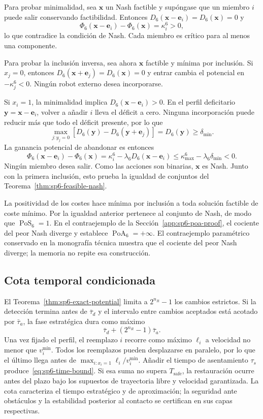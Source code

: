 Para probar minimalidad, sea $\boldsymbol x$ un Nash factible y supóngase que un miembro $i$ puede salir conservando factibilidad. Entonces
$D_6(\boldsymbol x-\boldsymbol e_i)=D_6(\boldsymbol x)=0$ y
\[
 \Phi_6(\boldsymbol x-\boldsymbol e_i)-\Phi_6(\boldsymbol x)=\kappa_i^6>0,
\]
lo que contradice la condición de Nash. Cada miembro es crítico para al menos una componente.

Para probar la inclusión inversa, sea ahora $\boldsymbol x$ factible y mínima por inclusión. Si $x_j=0$, entonces $D_6(\boldsymbol x+\boldsymbol e_j)=D_6(\boldsymbol x)=0$ y entrar cambia el potencial en $-\kappa_j^6<0$. Ningún robot externo desea incorporarse.

Si $x_i=1$, la minimalidad implica $D_6(\boldsymbol x-\boldsymbol e_i)>0$. En el perfil deficitario $\boldsymbol y=\boldsymbol x-\boldsymbol e_i$, volver a añadir $i$ lleva el déficit a cero. Ninguna incorporación puede reducir más que todo el déficit presente, por lo que
\[
 \max_{j:y_j=0}\left[D_6(\boldsymbol y)-D_6(\boldsymbol y+\boldsymbol e_j)\right]
 =D_6(\boldsymbol y)\geq\delta_{\min}.
\]
La ganancia potencial de abandonar es entonces
\[
 \Phi_6(\boldsymbol x-\boldsymbol e_i)-\Phi_6(\boldsymbol x)
 =\kappa_i^6-\lambda_6D_6(\boldsymbol x-\boldsymbol e_i)
 \leq\kappa_{\max}^6-\lambda_6\delta_{\min}<0.
\]
Ningún miembro desea salir. Como las acciones son binarias, $\boldsymbol x$ es Nash. Junto con la primera inclusión, esto prueba la igualdad de conjuntos del Teorema~\ref{thm:sp6-feasible-nash}.

La positividad de los costes hace mínima por inclusión a toda solución factible de coste mínimo. Por la igualdad anterior pertenece al conjunto de Nash, de modo que $\operatorname{PoS}_6=1$.
\ifdefined\VIUFullSPsixProofs
En el contraejemplo de la Sección~\ref{app:sp6-poa-proof}, el cociente del peor Nash diverge y establece $\operatorname{PoA}_6=+\infty$.
\else
El contraejemplo paramétrico conservado en la monografía técnica muestra que el cociente del peor Nash diverge; la memoria no repite esa construcción.
\fi

\ifdefined\VIUFullSPsixProofs
\subsection{Cota temporal condicionada}
\label{app:sp6-time-proof}

El Teorema~\ref{thm:sp6-exact-potential} limita a $2^{n_R}-1$ los cambios estrictos. Si la detección termina antes de $\bar\tau_d$ y el intervalo entre cambios aceptados está acotado por $\bar\tau_a$, la fase estratégica dura como máximo
\[
 \bar\tau_d+(2^{n_R}-1)\bar\tau_a.
\]
Una vez fijado el perfil, el reemplazo $i$ recorre como máximo $\ell_i$ a velocidad no menor que $v_i^{\min}$. Todos los reemplazos pueden desplazarse en paralelo, por lo que el último llega antes de
$\max_{i:x_i=1}\ell_i/v_i^{\min}$. Añadir el tiempo de asentamiento $\tau_s$ produce~\eqref{eq:sp6-time-bound}. Si esa suma no supera $T_{\mathrm{safe}}$, la restauración ocurre antes del plazo bajo los supuestos de trayectoria libre y velocidad garantizada. La cota caracteriza el tiempo estratégico y de aproximación; la seguridad ante obstáculos y la estabilidad posterior al contacto se certifican en sus capas respectivas.

